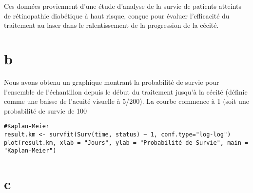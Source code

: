 \documentclass[../main.tex]{subfiles}
\begin{document}
\begin{CJK*}{UTF8}{gbsn}
Ces données proviennent d'une étude d'analyse de la survie de patients atteints de rétinopathie diabétique à haut risque, conçue pour évaluer l'efficacité du traitement au laser dans le ralentissement de la progression de la cécité.

\section{b}
Nous avons obtenu un graphique montrant la probabilité de survie pour l'ensemble de l'échantillon depuis le début du traitement jusqu'à la cécité (définie comme une baisse de l'acuité visuelle à 5/200). La courbe commence à 1 (soit une probabilité de survie de 100 %

\begin{lstlisting}
#Kaplan-Meier 
result.km <- survfit(Surv(time, status) ~ 1, conf.type="log-log")
plot(result.km, xlab = "Jours", ylab = "Probabilité de Survie", main = "Kaplan-Meier")

\end{lstlisting}

\section{c}


\end{CJK*}
\end{document}
